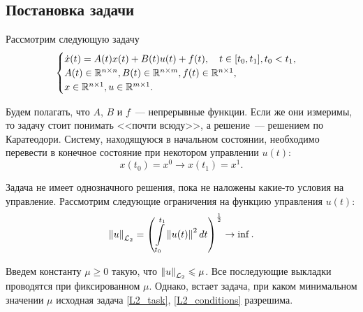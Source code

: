 \subsection{Постановка задачи}

Рассмотрим следующую задачу
\begin{gather}
\label{L2_task}
	\begin{cases}
	  \dot{x}(t) = A(t) x(t) + B(t) u(t) + f(t),\quad t \in [t_0, t_1], t_0 < t_1,\\
	  A(t) \in \mathbb R^{n \times n}, B(t) \in \mathbb R^{n \times m}, f(t) \in \mathbb R^{n \times 1},\\
	  x \in \mathbb R^{n \times 1}, u \in \mathbb R^{m \times 1}.
	\end{cases}
\end{gather}

Будем полагать, что $A$, $B$ и $f$~--- непрерывные функции.
Если же они измеримы, то задачу стоит понимать <<почти всюду>>, а решение~--- решением по Каратеодори.
Систему, находящуюся в начальном состоянии, необходимо перевести в конечное состояние при некотором управлении $u(t)$:
\begin{equation}
\label{L2_conditions}
	x(t_0) = x^0 \longrightarrow x(t_1)= x^1.
\end{equation}

Задача не имеет однозначного решения, пока не наложены какие-то условия на управление.
Рассмотрим следующие ограничения на функцию управления $u(t)$:
\begin{equation}
\label{L2_control_conditions}
	\left\| u \right\|_{{\mathcal{L}_2}} = \left(\int\limits_{t_0}^{t_1} \left\| u(t) \right\|^2 dt\right)^{\frac{1}{2}} \rightarrow \inf.
\end{equation}

Введем константу $\mu \geqslant 0$ такую, что $\left\| u \right\|_{{\mathcal{L}_2}} \leqslant \mu$.
Все последующие выкладки проводятся при фиксированном $\mu$.
Однако, встает задача, при каком минимальном значении $\mu$ исходная задача
\eqref{L2_task}, \eqref{L2_conditions} разрешима.
%

